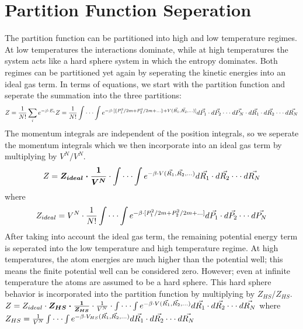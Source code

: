 \section{Partition Function Seperation}
The partition function can be partitioned into high and low temperature regimes. At low temperatures the interactions dominate, while at high temperatures the system acts like a hard sphere system in which the entropy dominates. Both regimes can be partitioned yet again by seperating the kinetic energies into an ideal gas term. In terms of equations, we start with the partition function and seperate the summation into the three partitions:
$$\newline Z=\frac{1}{N!}\sum_i e^{-\beta\cdot E_i}
\newline Z=\frac{1}{N!}\int\cdot\cdot\cdot\int e^{-\beta\cdot [\{P_{1}^2/{2m}+P_{2}^2/{2m}+...\}+V(\vec{R_1},\vec{R_2},...)]}d\vec{P_1}\cdot d\vec{P_2}\cdot\cdot\cdot d\vec{P_N}\cdot d\vec{R_1}\cdot d\vec{R_2}\cdot\cdot\cdot d\vec{R_N}\newline$$
The momentum integrals are independent of the position integrals, so we seperate the momentum integrals which we then incorporate into an ideal gas term by multiplying by $V^N/V^N$.
$$\newline Z=\boldsymbol{Z_{ideal} \cdot \frac{1}{V^N}}\cdot \int\cdot\cdot\cdot\int e^{-\beta\cdot V(\vec{R_1},\vec{R_2},...)}d\vec{R_1}\cdot d\vec{R_2}\cdot\cdot\cdot d\vec{R_N}\newline$$
where $$Z_{ideal}=V^N\cdot\frac{1}{N!}\int\cdot\cdot\cdot\int e^{-\beta\cdot [P_{1}^2/{2m}+P_{2}^2/{2m}+...]}d\vec{P_1}\cdot d\vec{P_2}\cdot\cdot\cdot d\vec{P_N}\newline$$
After taking into account the ideal gas term, the remaining potential energy term is seperated into the low temperature and high temperature regime. At high temperatures, the atom energies are much higher than the potential well; this means the finite potential well can be considered zero. However; even at infinite temperature the atoms are assumed to be a hard sphere. This hard sphere behavior is incorporated into the partition function by multiplying by $Z_{HS}/Z_{HS}$.
$\newline Z=Z_{ideal}\cdot \boldsymbol{Z_{HS}\cdot \frac{1}{Z_{HS}}}\cdot \frac{1}{V^N}\cdot \int\cdot\cdot\cdot\int e^{-\beta\cdot V(\vec{R_1},\vec{R_2},...)}d\vec{R_1}\cdot d\vec{R_2}\cdot\cdot\cdot d\vec{R_N}\newline$
where $Z_{HS}=\frac{1}{V^N}\int\cdot\cdot\cdot\int e^{-\beta\cdot V_{HS}(\vec{R_1},\vec{R_2},...)}d\vec{R_1}\cdot d\vec{R_2}\cdot\cdot\cdot d\vec{R_N}\newline$
